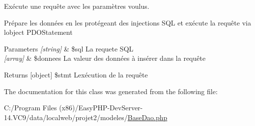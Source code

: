 Exécute une requête avec les paramètres voulus. 

Prépare les données en les protégeant des injections S\+QL et exécute la requête via l\textquotesingle{}object P\+D\+O\+Statement 
\begin{DoxyParams}{Parameters}
{\em \mbox{[}string\mbox{]}} & \$sql La requete S\+QL \\
\hline
{\em \mbox{[}array\mbox{]}} & \$donnees La valeur des données à insérer dans la requête \\
\hline
\end{DoxyParams}
\begin{DoxyReturn}{Returns}
\mbox{[}object\mbox{]} \$stmt L\textquotesingle{}exécution de la requête 
\end{DoxyReturn}


The documentation for this class was generated from the following file\+:\begin{DoxyCompactItemize}
\item 
C\+:/\+Program Files (x86)/\+Easy\+P\+H\+P-\/\+Dev\+Server-\/14.\+V\+C9/data/localweb/projet2/modeles/\hyperlink{_base_dao_8php}{Base\+Dao.\+php}\end{DoxyCompactItemize}
